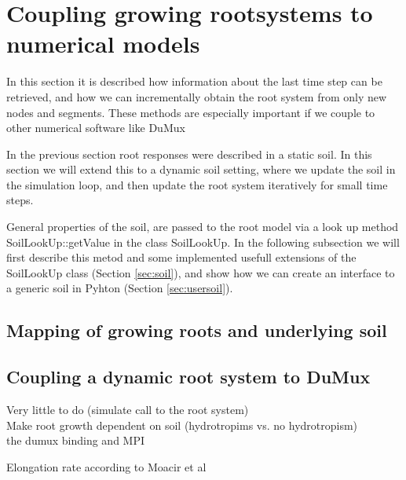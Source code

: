 \newpage
\section{Coupling growing rootsystems to numerical models} \label{sec:growing}


In this section it is described how information about the last time step can be retrieved, 
and how we can incrementally obtain the root system from only new nodes and segments. 
These methods are especially important if we couple to other numerical software like DuMux


In the previous section root responses were described in a static soil. 
In this section we will extend this to a dynamic soil setting, where we update the soil in the simulation loop, and then update the root system iteratively for small time steps. 

General properties of the soil, are passed to the root model via a look up method SoilLookUp::getValue in the class SoilLookUp. 
In the following subsection we will first describe this metod and some implemented usefull extensions of the SoilLookUp class (Section \ref{sec:soil}), 
and show how we can create an interface to a generic soil in Pyhton (Section \ref{sec:usersoil}). 

\subsection{Mapping of growing roots and underlying soil} 





\subsection{Coupling a dynamic root system to DuMux} \label{sec:dumux_dyn_coupling}

Very little to do (simulate call to the root system) \\



Make root growth dependent on soil (hydrotropims vs. no hydrotropism) \\

the dumux binding and MPI

Elongation rate according to Moacir et al \\
